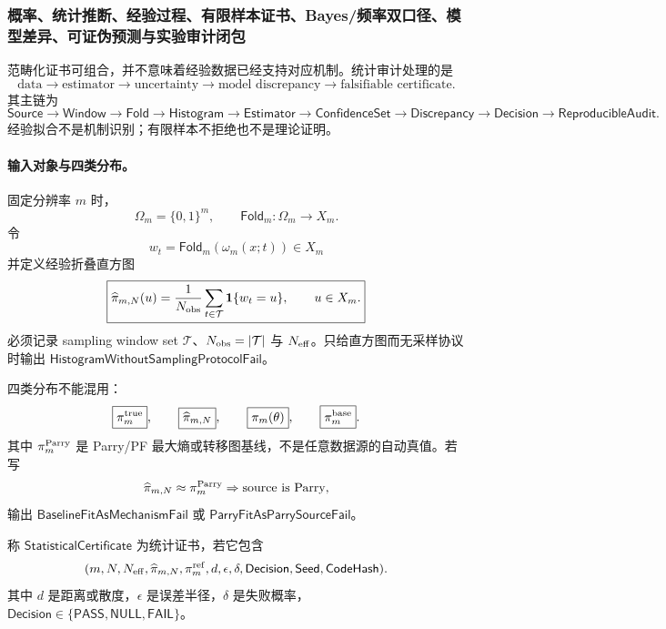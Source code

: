 \subsubsection{概率、统计推断、经验过程、有限样本证书、Bayes/频率双口径、模型差异、可证伪预测与实验审计闭包}\label{subsubsec:typed-address-biaxial-completion-statistical-audit-finite-sample-falsifiability-closure}
范畴化证书可组合，并不意味着经验数据已经支持对应机制。统计审计处理的是
\[
\boxed{
\text{data}
\to
\text{estimator}
\to
\text{uncertainty}
\to
\text{model discrepancy}
\to
\text{falsifiable certificate}.
}
\]
其主链为
\[
\boxed{
\mathsf{Source}
\to
\mathsf{Window}
\to
\mathsf{Fold}
\to
\mathsf{Histogram}
\to
\mathsf{Estimator}
\to
\mathsf{ConfidenceSet}
\to
\mathsf{Discrepancy}
\to
\mathsf{Decision}
\to
\mathsf{ReproducibleAudit}.
}
\]
经验拟合不是机制识别；有限样本不拒绝也不是理论证明。

\paragraph{输入对象与四类分布。}
固定分辨率 \(m\) 时，
\[
\Omega_m=\{0,1\}^m,\qquad
\mathsf{Fold}_m:\Omega_m\to X_m.
\]
令
\[
w_t=\mathsf{Fold}_m(\omega_m(x;t))\in X_m
\]
并定义经验折叠直方图
\[
\boxed{
\widehat\pi_{m,N}(u)
=
\frac1{N_{\rm obs}}
\sum_{t\in\mathcal T}\mathbf 1\{w_t=u\},
\qquad u\in X_m.
}
\]
必须记录 sampling window set \(\mathcal T\)、\(N_{\rm obs}=|\mathcal T|\) 与 \(N_{\rm eff}\)。只给直方图而无采样协议时输出 \(\mathsf{HistogramWithoutSamplingProtocolFail}\)。

四类分布不能混用：
\[
\boxed{\pi_m^{\rm true}},\qquad
\boxed{\widehat\pi_{m,N}},\qquad
\boxed{\pi_m(\theta)},\qquad
\boxed{\pi_m^{\rm base}}.
\]
其中 \(\pi_m^{\rm Parry}\) 是 Parry/PF 最大熵或转移图基线，不是任意数据源的自动真值。若写
\[
\widehat\pi_{m,N}\approx\pi_m^{\rm Parry}
\Rightarrow
\text{source is Parry},
\]
输出 \(\mathsf{BaselineFitAsMechanismFail}\) 或 \(\mathsf{ParryFitAsParrySourceFail}\)。

\begin{definition}[统计证书]\label{def:typed-address-biaxial-completion-statistical-certificate}
称 \(\mathsf{StatisticalCertificate}\) 为统计证书，若它包含
\[
(m,N,N_{\rm eff},\widehat\pi_{m,N},\pi_m^{\rm ref},d,\epsilon,\delta,\mathsf{Decision},\mathsf{Seed},\mathsf{CodeHash}).
\]
其中 \(d\) 是距离或散度，\(\epsilon\) 是误差半径，\(\delta\) 是失败概率，\(\mathsf{Decision}\in\{\mathsf{PASS},\mathsf{NULL},\mathsf{FAIL}\}\)。
\end{definition}

